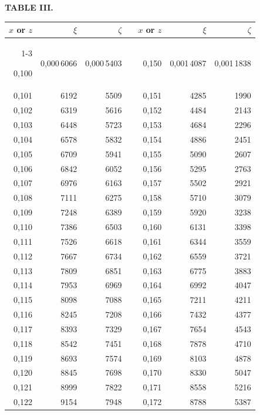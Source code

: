 \endgroup
\clearpage
{}
\begingroup
\centering
\fontsize{9}{9}\selectfont
\setlength{\tabcolsep}{8pt}
\renewcommand{\arraystretch}{1}
\setlength{\parskip}{0pt}
\textbf{TABLE III.}
\par\vspace{7pt}
\begin{tabular}{|r|r|r|@{}p{9pt}@{}|r|r|r|}
\hline
\rule{0pt}{8.5pt}\(x\) or \(z\) & \(\xi\) & \(\zeta\) & & \(x\) or \(z\) & \(\xi\) & \(\zeta\) \\
\cline{1-3}\cline{5-7}
\rule{0pt}{8.5pt}0,100 & 0,000\,6066 & 0,000\,5403 &  & 0,150 & 0,001\,4087 & 0,001\,1838 \\
0,101 & 6192 & 5509 &  & 0,151 & 4285 & 1990 \\
0,102 & 6319 & 5616 &  & 0,152 & 4484 & 2143 \\
0,103 & 6448 & 5723 &  & 0,153 & 4684 & 2296 \\
0,104 & 6578 & 5832 &  & 0,154 & 4886 & 2451 \\
0,105 & 6709 & 5941 &  & 0,155 & 5090 & 2607 \\[3pt]
0,106 & 6842 & 6052 &  & 0,156 & 5295 & 2763 \\
0,107 & 6976 & 6163 &  & 0,157 & 5502 & 2921 \\
0,108 & 7111 & 6275 &  & 0,158 & 5710 & 3079 \\
0,109 & 7248 & 6389 &  & 0,159 & 5920 & 3238 \\
0,110 & 7386 & 6503 &  & 0,160 & 6131 & 3398 \\[3pt]
0,111 & 7526 & 6618 &  & 0,161 & 6344 & 3559 \\
0,112 & 7667 & 6734 &  & 0,162 & 6559 & 3721 \\
0,113 & 7809 & 6851 &  & 0,163 & 6775 & 3883 \\
0,114 & 7953 & 6969 &  & 0,164 & 6992 & 4047 \\
0,115 & 8098 & 7088 &  & 0,165 & 7211 & 4211 \\[3pt]
0,116 & 8245 & 7208 &  & 0,166 & 7432 & 4377 \\
0,117 & 8393 & 7329 &  & 0,167 & 7654 & 4543 \\
0,118 & 8542 & 7451 &  & 0,168 & 7878 & 4710 \\
0,119 & 8693 & 7574 &  & 0,169 & 8103 & 4878 \\
0,120 & 8845 & 7698 &  & 0,170 & 8330 & 5047 \\[3pt]
0,121 & 8999 & 7822 &  & 0,171 & 8558 & 5216 \\
0,122 & 9154 & 7948 &  & 0,172 & 8788 & 5387 \\

\end{tabular}

